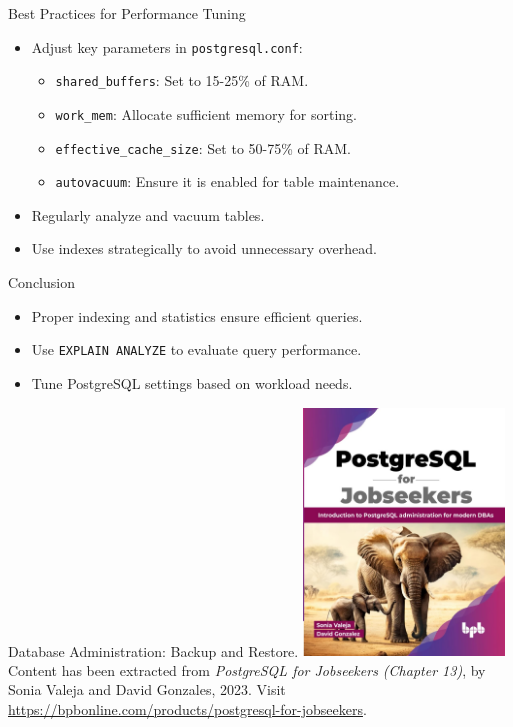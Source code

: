 \documentclass{beamer}
\begin{document}
\begin{frame}{Best Practices for Performance Tuning}
    \begin{itemize}
        \item Adjust key parameters in \texttt{postgresql.conf}:
        \begin{itemize}
            \item \texttt{shared\_buffers}: Set to 15-25\% of RAM.
            \item \texttt{work\_mem}: Allocate sufficient memory for sorting.
            \item \texttt{effective\_cache\_size}: Set to 50-75\% of RAM.
            \item \texttt{autovacuum}: Ensure it is enabled for table maintenance.
        \end{itemize}
        \item Regularly analyze and vacuum tables.
        \item Use indexes strategically to avoid unnecessary overhead.
    \end{itemize}
\end{frame}

\begin{frame}{Conclusion}
    \begin{itemize}
        \item Proper indexing and statistics ensure efficient queries.
        \item Use \texttt{EXPLAIN ANALYZE} to evaluate query performance.
        \item Tune PostgreSQL settings based on workload needs.
    \end{itemize}
\end{frame}

\begin{frame}{Database Administration: Backup and Restore.}
    \centering
    \includegraphics[width=0.4\textwidth]{figures/book_cover}\\
    \vspace{2mm}
    {
        \scriptsize
        Content has been extracted from \textit{PostgreSQL for Jobseekers (Chapter 13)}, by Sonia Valeja and David Gonzales, 2023.  Visit \url{https://bpbonline.com/products/postgresql-for-jobseekers}.\\
    }
\end{frame}
\end{document}
